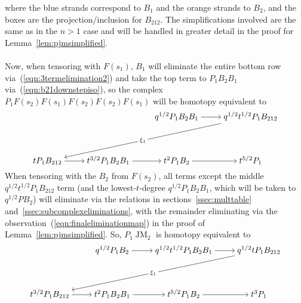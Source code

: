 \documentclass[11pt]{article}
\DeclareMathOperator{\JM}{JM}
\theoremstyle{definition}
\theoremstyle{remark}
\numberwithin{equation}{section}
\begin{document}
where the blue strands correspond to $B_1$ and the orange strands to
$B_2$, and the boxes are the projection/inclusion for $B_{212}$. The simplifications
involved are the same as in the $n > 1$ case and will be handled in greater detail
in the proof for Lemma~\ref{lem:pjmsimplified}.
\\ \\
Now, when tensoring
with $F(s_1)$, $B_1$ will eliminate the entire bottom row
via~(\ref{eqn:3termelimination2}) and take the top term to
$P_1B_{2}B_1$ via~(\ref{eqn:b21downstepiso}), so the complex
$P_1F(s_2)F(s_1)F(s_2)F(s_2)F(s_1)$ will be homotopy
equivalent to
\[\begin{tikzcd}[ampersand replacement=\&,cramped]
	\&\& {q^{1/2}P_1B_2B_1} \& {q^{1/2}t^{1/2}P_1B_{212}} \\
	\\
	{tP_1B_{212}} \& {t^{3/2}P_1B_2B_1} \& {t^2P_1B_2} \& {t^{5/2}P_1}
	\arrow[from=1-3, to=1-4]
	\arrow["\xi_1"{description}, from=1-4, to=3-1]
	\arrow[from=3-1, to=3-2]
	\arrow[from=3-2, to=3-3]
	\arrow[from=3-3, to=3-4]
\end{tikzcd}\]
When tensoring with the $B_2$ from $F(s_2)$, all terms except the middle
$q^{1/2}t^{1/2}P_1B_{212}$ term
(and the lowest-$t$-degree $q^{1/2}P_1B_2B_1$, which
will be taken to $q^{1/2}PB_2$) will eliminate via the relations
in sections~\ref{ssec:multtable}
and~\ref{ssec:subcomplexeliminations}, with the remainder eliminating
via the observation~(\ref{eqn:finaleliminationmap}) in the proof of
Lemma~\ref{lem:pjmsimplified}. So, $P_1\JM_2$ is homotopy equivalent to
\begin{equation}
	\label{eqn:p1jm2simplified}
	\begin{tikzcd}[ampersand replacement=\&,cramped]
	\& {q^{1/2}P_1B_2} \& {q^{1/2}t^{1/2}P_1B_2B_1} \& {q^{1/2}tP_1B_{212}} \\
	\\
	{t^{3/2}P_1B_{212}} \& {t^{2}P_1B_2B_1} \& {t^{5/2}P_1B_2} \& {t^{3}P_1}
	\arrow[from=1-2, to=1-3]
	\arrow[from=1-3, to=1-4]
	\arrow["\xi_1"{description}, from=1-4, to=3-1]
	\arrow[from=3-1, to=3-2]
	\arrow[from=3-2, to=3-3]
	\arrow[from=3-3, to=3-4]
\end{tikzcd}\end{equation}
\end{document}
